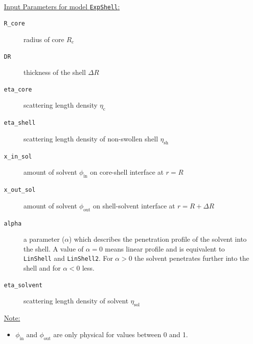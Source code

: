 \hspace{1pt}\\
\uline{Input Parameters for model \texttt{ExpShell}:}\\
\begin{description}
\item[\texttt{R\_core}] radius of core  $R_c$
\item[\texttt{DR}] thickness of the shell $\Delta R$
\item[\texttt{eta\_core}] scattering length density $\eta_\text{c}$
\item[\texttt{eta\_shell}] scattering length density of non-swollen shell $\eta_\text{sh}$
\item[\texttt{x\_in\_sol}] amount of solvent $\phi_\text{in}$ on core-shell interface at $r=R$
\item[\texttt{x\_out\_sol}] amount of solvent $\phi_\text{out}$ on shell-solvent interface at $r=R+\Delta R$
\item[\texttt{alpha}]  a parameter ($\alpha$) which describes the penetration profile of the solvent into the shell.
A value of $\alpha=0$ means linear profile and is equivalent to {\tt LinShell} and {\tt LinShell2}. For $\alpha>0$
the solvent penetrates further into the shell and for $\alpha<0$ less.
\item[\texttt{eta\_solvent}] scattering length density of solvent $\eta_\text{sol}$
\end{description}

\noindent\uline{Note:}
\begin{itemize}
\item $\phi_\text{in}$ and $\phi_\text{out}$ are only physical for values between 0 and 1.
\end{itemize}

